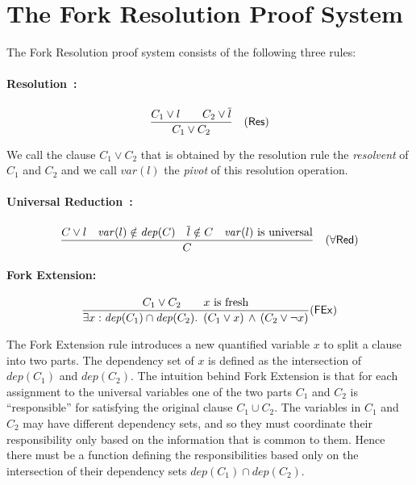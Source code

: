 \documentclass{svjour3}
\newcommand{\dep}{\mathit{dep}}
\newcommand{\var}{\mathit{var}}
\begin{document}
\section{The Fork Resolution Proof System}
\label{sect:proofsystem}

The Fork Resolution proof system consists of the following three rules:

\paragraph{Resolution~\cite{DavisPutnam/1960/AComputingProcedureForQuantificationTheory}:}
\[
\frac{C_1\vee l\qquad C_2\vee \overline{l}}{C_1 \vee C_2}\quad(\sf{Res})
\]

We call the clause $C_1 \vee C_2$ that is obtained by the resolution rule the \emph{resolvent} of $C_1$ and $C_2$ and we call $\var(l)$ the \emph{pivot} of this resolution operation.


\paragraph{Universal Reduction~\cite{BuningKarpinskiFlogel/1995/ResolutionforQBF}:}
\[
\frac{C\vee l \quad 
	\var(l) \notin \dep(C) \quad
	\overline{l}\notin C \quad 
	\var(l)\text{ is universal} %
}{C}\quad(\forall \sf{Red})
\]

\paragraph{Fork Extension:}
\[
\frac{C_1 \vee C_2 \qquad x\text{ is fresh}}{\exists x: \dep(C_1)\cap \dep(C_2).~\, (C_1\vee x)\,\wedge\,(C_2\vee\neg x)}(\sf{FEx})
\] %

The Fork Extension rule introduces a new quantified variable $x$ to split a clause into two parts. 
The dependency set of $x$ is defined as the intersection of $\dep(C_1)$ and $\dep(C_2)$. 
The intuition behind Fork Extension is that for each assignment to the universal variables one of the two parts $C_1$ and $C_2$ is ``responsible'' for satisfying the original clause $C_1 \cup C_2$. 
The variables in $C_1$ and $C_2$ may have different dependency sets, and so they must coordinate their responsibility only based on the information that is common to them. 
Hence there must be a function defining the responsibilities based only on the intersection of their dependency sets $\dep(C_1)\cap\dep(C_2)$.
\end{document}
